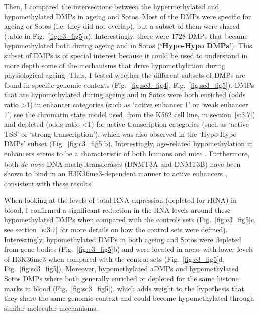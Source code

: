 \bigskip

Then, I compared the intersections between the hypermethylated and hypomethylated DMPs in ageing and Sotos. Most of the DMPs were specific for ageing or Sotos (i.e. they did not overlap), but a subset of them were shared (table in Fig.~\ref{fig:c3_fig5}a). Interestingly, there were 1728 DMPs that became hypomethylated both during ageing and in Sotos (\textbf{`Hypo-Hypo DMPs'}). This subset of DMPs is of special interest because it could be used to understand in more depth some of the mechanisms that drive hypomethylation during physiological ageing. Thus, I tested whether the different subsets of DMPs are found in specific genomic contexts (Fig.~\ref{fig:sc3_fig4}, Fig.~\ref{fig:sc3_fig5}). DMPs that are hypomethylated during ageing and in Sotos were both enriched (odds ratio >1) in enhancer categories (such as `active enhancer 1' or `weak enhancer 1', see the chromatin state model used, from the K562 cell line, in section~\ref{s:3.7}) and depleted (odds ratio <1) for active transcription categories (such as `active TSS' or `strong transcription'), which was also observed in the `Hypo-Hypo DMPs' subset (Fig.~\ref{fig:c3_fig5}b). Interestingly, age-related hypomethylation in enhancers seems to be a characteristic of both humans \cite{Slieker2016,Slieker2018} and mice \cite{Cole2017}. Furthermore, both \textit{de novo} DNA methyltransferases (DNMT3A and DNMT3B) have been shown to bind in an H3K36me3-dependent manner to active enhancers \cite{Rinaldi2016}, consistent with these results.

\bigskip

When looking at the levels of total RNA expression (depleted for \acrshort{rRNA}) in blood, I confirmed a significant reduction in the RNA levels around these hypomethylated DMPs when compared with the controls sets (Fig.~\ref{fig:c3_fig5}c, see section~\ref{s:3.7} for more details on how the control sets were defined). Interestingly, hypomethylated DMPs in both ageing and Sotos were depleted from gene bodies (Fig.~\ref{fig:c3_fig5}b) and were located in areas with lower levels of H3K36me3 when compared with the control sets (Fig.~\ref{fig:c3_fig5}d, Fig.~\ref{fig:sc3_fig5}). Moreover, hypomethylated aDMPs and hypomethylated Sotos DMPs where both generally enriched or depleted for the same histone marks in blood (Fig.~\ref{fig:sc3_fig5}), which adds weight to the hypothesis that they share the same genomic context and could become hypomethylated through similar molecular mechanisms.

\bigskip

